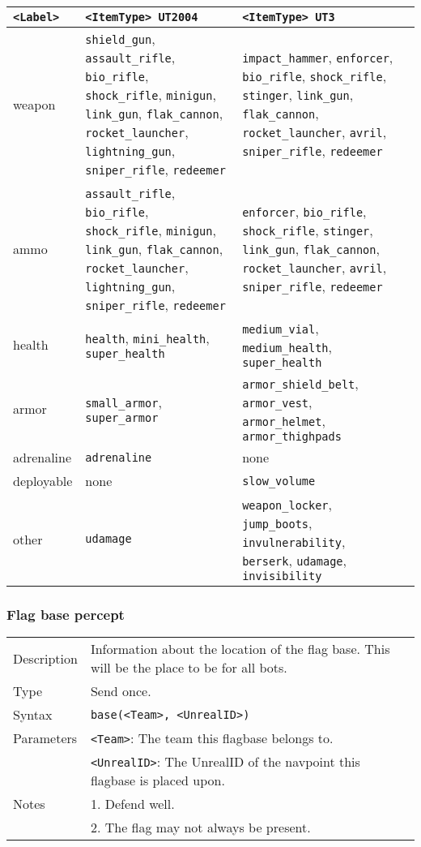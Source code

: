 \documentclass[11pt,a4paper]{article}
\begin{document}
\begin{small}
\begin{tabular}{|p{2cm}|p{6cm}|p{6cm}|p{6cm}|}	
	\hline
\verb|<Label>| & \verb|<ItemType> UT2004| & \verb|<ItemType> UT3|\\
\hline
weapon &
\verb|shield_gun|, \verb|assault_rifle|, \verb|bio_rifle|, \verb|shock_rifle|, \verb|minigun|, \verb|link_gun|, \verb|flak_cannon|, \verb|rocket_launcher|, \verb|lightning_gun|, \verb|sniper_rifle|, \verb|redeemer| &
\verb|impact_hammer|, \verb|enforcer|, \verb|bio_rifle|, \verb|shock_rifle|, \verb|stinger|, \verb|link_gun|, \verb|flak_cannon|, \verb|rocket_launcher|, \verb|avril|, \verb|sniper_rifle|, \verb|redeemer| \\
ammo &
\verb|assault_rifle|, \verb|bio_rifle|, \verb|shock_rifle|, \verb|minigun|, \verb|link_gun|, \verb|flak_cannon|, \verb|rocket_launcher|, \verb|lightning_gun|, \verb|sniper_rifle|, \verb|redeemer| &
\verb|enforcer|, \verb|bio_rifle|, \verb|shock_rifle|, \verb|stinger|, \verb|link_gun|, \verb|flak_cannon|, \verb|rocket_launcher|, \verb|avril|, \verb|sniper_rifle|, \verb|redeemer| \\
health & \verb|health|, \verb|mini_health|, \verb|super_health| & \verb|medium_vial|, \verb|medium_health|, \verb|super_health|\\
armor & \verb|small_armor|, \verb|super_armor| & \verb|armor_shield_belt|, \verb|armor_vest|, \verb|armor_helmet|, \verb|armor_thighpads|\\
adrenaline & \verb|adrenaline| & none\\
deployable & none & \verb|slow_volume|\\
other & \verb|udamage| & \verb|weapon_locker|, \verb|jump_boots|, \verb|invulnerability|, \verb|berserk|, \verb|udamage|, \verb|invisibility| \\
 \hline
\end{tabular}
\end{small}

\subsubsection*{Flag base percept}
\begin{small}
\begin{tabular}{p{2cm}p{9cm}}
Description & Information about the location of the flag base. This will be the place to be for all bots.\\
Type & Send once.\\
Syntax & \verb|base(<Team>, <UnrealID>)|\\ 
Parameters &
	\verb|<Team>|: The team this flagbase belongs to.\\
&	\verb|<UnrealID>|: The UnrealID of the navpoint this flagbase is placed upon.\\
Notes & 
	1.	Defend well.\\
&	2.	The flag may not always be present.
\end{tabular}
\end{small}
\end{document}

